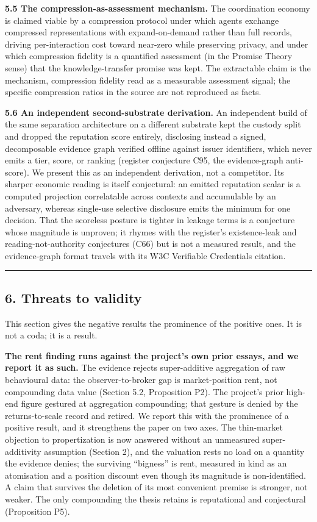 \documentclass[
  11pt,
]{article}
\begin{document}
\textbf{5.5 The compression-as-assessment mechanism.} The coordination
economy is claimed viable by a compression protocol under which agents
exchange compressed representations with expand-on-demand rather than
full records, driving per-interaction cost toward near-zero while
preserving privacy, and under which compression fidelity is a quantified
assessment (in the Promise Theory sense) that the knowledge-transfer
promise was kept. The extractable claim is the mechanism, compression
fidelity read as a measurable assessment signal; the specific
compression ratios in the source are not reproduced as facts.

\textbf{5.6 An independent second-substrate derivation.} An independent
build of the same separation architecture on a different substrate kept
the custody split and dropped the reputation score entirely, disclosing
instead a signed, decomposable evidence graph verified offline against
issuer identifiers, which never emits a tier, score, or ranking
(register conjecture C95, the evidence-graph anti-score). We present
this as an independent derivation, not a competitor. Its sharper
economic reading is itself conjectural: an emitted reputation scalar is
a computed projection correlatable across contexts and accumulable by an
adversary, whereas single-use selective disclosure emits the minimum for
one decision. That the scoreless posture is tighter in leakage terms is
a conjecture whose magnitude is unproven; it rhymes with the register's
existence-leak and reading-not-authority conjectures (C66) but is not a
measured result, and the evidence-graph format travels with its W3C
Verifiable Credentials citation.

\begin{center}\rule{0.5\linewidth}{0.5pt}\end{center}

\subsection{6. Threats to validity}\label{threats-to-validity}

This section gives the negative results the prominence of the positive
ones. It is not a coda; it is a result.

\textbf{The rent finding runs against the project's own prior essays,
and we report it as such.} The evidence rejects super-additive
aggregation of raw behavioural data: the observer-to-broker gap is
market-position rent, not compounding data value (Section 5.2,
Proposition P2). The project's prior high-end figure gestured at
aggregation compounding; that gesture is denied by the returns-to-scale
record and retired. We report this with the prominence of a positive
result, and it strengthens the paper on two axes. The thin-market
objection to propertization is now answered without an unmeasured
super-additivity assumption (Section 2), and the valuation rests no load
on a quantity the evidence denies; the surviving ``bigness'' is rent,
measured in kind as an atomisation and a position discount even though
its magnitude is non-identified. A claim that survives the deletion of
its most convenient premise is stronger, not weaker. The only
compounding the thesis retains is reputational and conjectural
(Proposition P5).
\end{document}
